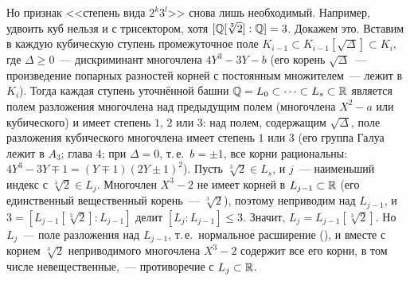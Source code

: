 \begin{aside}
Но признак <<степень вида $2^k3^l$>> снова лишь необходимый. Например, удвоить куб нельзя и с трисектором, хотя
$[\mathbb Q[\sqrt[3]2]:\mathbb Q]=3$. Докажем это. Вставим в каждую кубическую ступень промежуточное поле
$K_{i-1}\subset K_{i-1}[\sqrt\Delta]\subset K_i$, где $\Delta\ge0$~--- дискриминант многочлена $4Y^3-3Y-b$ (его корень
$\sqrt\Delta$~--- произведение попарных разностей корней с постоянным множителем~--- лежит в $K_i$). Тогда каждая ступень
уточнённой башни $\mathbb Q=L_0\subset\dots\subset L_s\subset\mathbb R$ является полем разложения многочлена над предыдущим полем
(многочлена $X^2-a$ или кубического) и имеет степень $1$, $2$ или $3$: над полем, содержащим $\sqrt\Delta$, поле разложения
кубического многочлена имеет степень $1$ или $3$ (его группа Галуа лежит в $A_3$; глава 4; при $\Delta=0$, т.\,е.\
$b=\pm1$, все корни рациональны: $4Y^3-3Y\mp1=(Y\mp1)(2Y\pm1)^2$). Пусть $\sqrt[3]2\in L_s$, и
$j$~--- наименьший индекс с $\sqrt[3]2\in L_j$. Многочлен $X^3-2$ не имеет корней в $L_{j-1}\subset\mathbb R$ (его единственный
вещественный корень~--- $\sqrt[3]2$), поэтому неприводим над $L_{j-1}$, и $3=[L_{j-1}[\sqrt[3]2]:L_{j-1}]$ делит
$[L_j:L_{j-1}]\le3$. Значит, $L_j=L_{j-1}[\sqrt[3]2]$. Но $L_j$~--- поле разложения над $L_{j-1}$, т.\,е.\ нормальное
расширение (\rf{3.10a}), и вместе с корнем $\sqrt[3]2$ неприводимого многочлена $X^3-2$ содержит все его корни, в том
числе невещественные,~--- противоречие с $L_j\subset\mathbb R$.
\end{aside}

